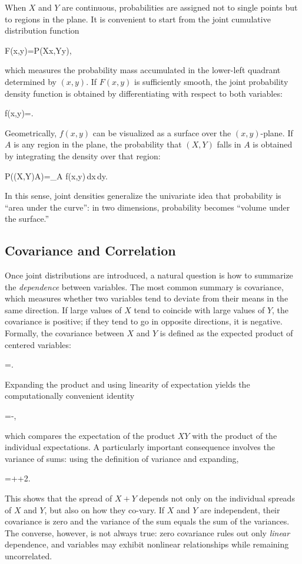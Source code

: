 When $X$ and $Y$ are continuous, probabilities are assigned not to single points but to regions in the plane. It is convenient to start from the \alert{joint cumulative distribution function}
\begin{myequation}
F(x,y)=P(X\le x,\;Y\le y),
\end{myequation}
which measures the probability mass accumulated in the lower-left quadrant determined by $(x,y)$. If $F(x,y)$ is sufficiently smooth, the \alert{joint probability density function} is obtained by differentiating with respect to both variables:
\begin{myequation}
f(x,y)=.
\end{myequation}
Geometrically, $f(x,y)$ can be visualized as a surface over the $(x,y)$-plane. If $A$ is any region in the plane, the probability that $(X,Y)$ falls in $A$ is obtained by integrating the density over that region:
\begin{myequation}
P\big((X,Y)\in A\big)=\iint_A f(x,y)\,dx\,dy.
\end{myequation}
In this sense, joint densities generalize the univariate idea that probability is ``area under the curve'': in two dimensions, probability becomes ``volume under the surface.''

\subsection*{Covariance and Correlation}

Once joint distributions are introduced, a natural question is how to summarize the \emph{dependence} between variables. The most common summary is \alert{covariance}, which measures whether two variables tend to deviate from their means in the same direction. If large values of $X$ tend to coincide with large values of $Y$, the covariance is positive; if they tend to go in opposite directions, it is negative. Formally, the covariance between $X$ and $Y$ is defined as the expected product of centered variables:
\begin{myequation}
=.
\end{myequation}
Expanding the product and using linearity of expectation yields the computationally convenient identity
\begin{myequation}
=-,
\end{myequation}
which compares the expectation of the product $XY$ with the product of the individual expectations. A particularly important consequence involves the variance of sums: using the definition of variance and expanding,
\begin{myequation}
=++2.
\end{myequation}
This shows that the spread of $X+Y$ depends not only on the individual spreads of $X$ and $Y$, but also on how they co-vary. If $X$ and $Y$ are independent, their covariance is zero and the variance of the sum equals the sum of the variances. The converse, however, is not always true: zero covariance rules out only \emph{linear} dependence, and variables may exhibit nonlinear relationships while remaining uncorrelated.

